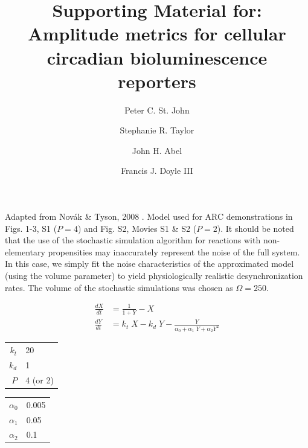 \documentclass[11pt, letterpaper]{article}
\begin{document}
\title{Supporting Material for:\\ Amplitude metrics for cellular \\ circadian bioluminescence reporters}
\author[1]{Peter C. St. John}
\author[2]{Stephanie R. Taylor}
\author[1]{John H. Abel}
\author[1,*]{Francis J. Doyle III}
\date{}
\maketitle

\begin{model}
\caption{
Adapted from Nov\'{a}k \& Tyson, 2008 \cite{Novak2008}. Model used for
ARC demonstrations in Figs. 1-3, S1 ($P=4$) and Fig. S2, Movies S1 \& S2
($P=2$).
It should be noted that the use of the stochastic simulation algorithm for reactions with non-elementary propensities may inaccurately represent the noise of the full system.
In this case, we simply fit the noise characteristics of the approximated model (using the volume parameter) to yield physiologically realistic desynchronization rates. The volume of the stochastic simulations was chosen as $\Omega = 250$.
}
  \centering
\begin{align*}
  \frac{dX}{dt} &= \frac{1}{1 + Y} - X \\
  \frac{dY}{dt} &= k_t \; X - k_d \; Y - \frac{Y}{\alpha_0 + \alpha_1 \; Y +
  \alpha_2 Y^2}
\end{align*}
  
\begin{supertabular}{rl}
$k_t$ & 20 \\
$k_d$ & 1  \\
$P$   & 4 (or 2)  \\
\bottomrule\end{supertabular}\hspace{3ex}
\begin{supertabular}{rl}
$\alpha_0$ & 0.005 \\
$\alpha_1$ & 0.05  \\
$\alpha_2$ & 0.1   \\
\bottomrule\end{supertabular}
\end{model}
\end{document}
